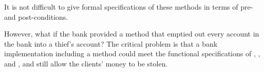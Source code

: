 %
%
%
It is not difficult to give formal specifications of these methods in terms of 
pre- and post-conditions. 

However,   what if the bank provided a  method that 
 emptied out every account in the bank into a thief's account?
%
%
% 
The critical problem is that a bank implementation
 including a 
method could meet the functional specifications of 
, , and ,
and still allow the clients' money to be stolen.
%

